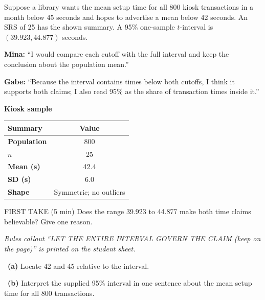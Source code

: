 \documentclass[11pt]{article}
\begin{document}
Suppose a library wants the mean setup time for all 800 kiosk transactions in a month below 45 seconds and hopes to advertise a mean below 42 seconds. An SRS of 25 has the shown summary. A 95\% one-sample $t$-interval is $(39.923,44.877)$ seconds.\par\smallskip \textbf{Mina:} ``I would compare each cutoff with the full interval and keep the conclusion about the population mean.''\par \textbf{Gabe:} ``Because the interval contains times below both cutoffs, I think it supports both claims; I also read 95\% as the share of transaction times inside it.''\par
\begin{center}
\textbf{Kiosk sample}\par\smallskip
\begin{tabular}{|l|c|}
\hline
\textbf{Summary} & \textbf{Value} \\ \hline
\textbf{Population} & 800 \\ \hline
\textbf{$n$} & 25 \\ \hline
\textbf{Mean (s)} & 42.4 \\ \hline
\textbf{SD (s)} & 6.0 \\ \hline
\textbf{Shape} & Symmetric; no outliers \\ \hline
\end{tabular}
\end{center}
\begin{firsttakebox}{FIRST TAKE (5 min)}
Does the range 39.923 to 44.877 make both time claims believable? Give one reason.\par
{}
\end{firsttakebox}

\textit{Rules callout ``LET THE ENTIRE INTERVAL GOVERN THE CLAIM (keep on the page)'' is printed on the student sheet.}\par\medskip

~\textbf{(a)} Locate 42 and 45 relative to the interval.\par
{}

~\textbf{(b)} Interpret the supplied 95\% interval in one sentence about the mean setup time for all 800 transactions.\par
{}
\end{document}
